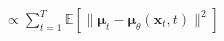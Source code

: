 \documentclass[preview]{standalone}
\begin{document}
\begin{align*}
\propto \sum_{t=1}^{T} \mathbb{E} \left[ \| \boldsymbol{\mu}_t - \boldsymbol{\mu}_\theta(\mathbf{x}_t, t) \|^2 \right]
\end{align*}
\end{document}
